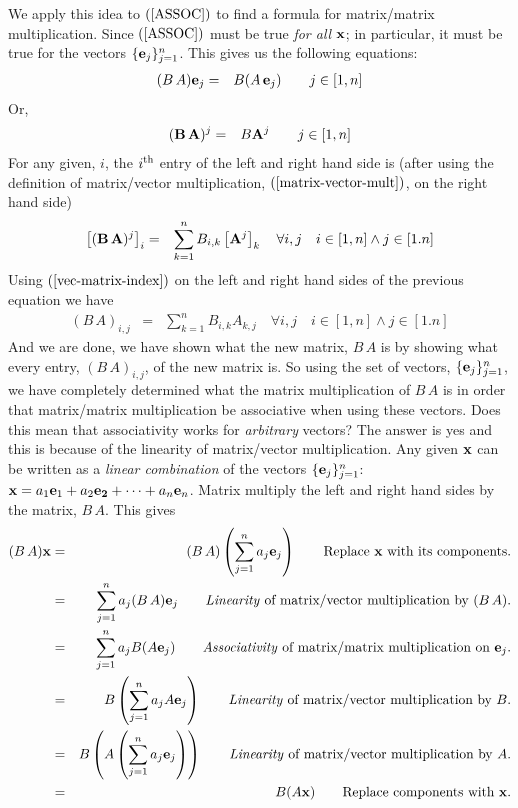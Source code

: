 \documentclass{article}
\begin{document}
We apply this idea to $(\ref{ASSOC})$ to find a formula for matrix/matrix multiplication.
Since $(\ref{ASSOC})$ must be true {\em for all\/} ${\bf x}$; in particular, it must be
true for the vectors $\{{\bf e}_j\}_{j=1}^n$.
This gives us the following equations:
\begin{eqnarray}
	(B \, A) {\bf e}_j & = & B (A \, {\bf e}_j) \quad\quad \text{$j \in [1,n]$} 
\end{eqnarray}
Or,
\begin{eqnarray}
	({\bf B} \, {\bf A})^j & = & B  {\bf A}^j \quad\quad \text{$j \in [1, n]$}
\end{eqnarray}
For any given, $i$, the $i^{\rm th}$ entry of the left and right hand side is
(after using the definition of matrix/vector 
multiplication, $(\ref{matrix-vector-mult})$, on the right hand side)
\begin{eqnarray}
	\left[({\bf B} \, {\bf A})^j\right]_i & = & \sum_{k=1}^n B_{i,k}  \left[{\bf A}^j\right]_k  \quad \forall i,j \quad i \in [1, n] \wedge j \in [1.n]
\end{eqnarray}
Using $(\ref{vec-matrix-index})$ on the left and right hand sides of the previous equation we have
\begin{eqnarray}
	(B \, A)_{i, j} & = & \sum_{k=1}^n B_{i, k}  A_{k, j}  \quad \forall i,j \quad i \in [1, n] \wedge j \in [1.n] \label{matrix-matrix-mult}
\end{eqnarray}
And we are done, we have shown what the new matrix, $B \, A$ is by showing what every entry, $(B\, A)_{i, j}$, of
the new matrix is.
So using the set of vectors, $\{{\bf e}_j\}_{j=1}^n$, we have completely determined what 
the matrix multiplication of $B \, A$ is in order that matrix/matrix multiplication be 
associative when using these vectors. Does this mean that associativity works for 
{\em arbitrary\/} vectors? The answer is yes and this is because of the linearity of
matrix/vector multiplication. Any given ${\bf x}$ can be written as a {\em linear combination\/}
of the vectors $\{{\bf e}_j\}_{j=1}^n$: ${\bf x} = a_1 {\bf e}_1 + a_2 {\bf e_2} + \cdots + a_n {\bf e}_n$.
Matrix multiply the left and right hand sides by the matrix, $B\,A$. This gives
\begin{eqnarray}
	(B\, A){\bf x} & = & (B \, A)\left(\sum_{j=1}^n a_j {\bf e}_j\right) \quad\quad \text{Replace ${\bf x}$ with its components.}\nonumber \\
				   & = &\sum_{j=1}^n a_j (B \, A){\bf e}_j \quad\quad \text{{\em Linearity\/} of matrix/vector multiplication by $(B \, A)$.}\nonumber \\
				   & = &\sum_{j=1}^n a_j B (A{\bf e}_j) \quad\quad \text{{\em Associativity\/} of matrix/matrix multiplication on ${\bf e}_j$.}\nonumber \\
				   & = &B\left(\sum_{j=1}^n a_j A{\bf e}_j\right) \quad\quad \text{{\em Linearity\/} of matrix/vector multiplication by $B$.}\nonumber \\
				   & = &B\left( A\left(\sum_{j=1}^n a_j {\bf e}_j\right)\right) \quad\quad \text{{\em Linearity\/} of matrix/vector multiplication by  $A$.}\nonumber \\
				   & = &B( A {\bf x}) \quad\quad \text{Replace components with ${\bf x}$.}
\end{eqnarray}
\end{document}
